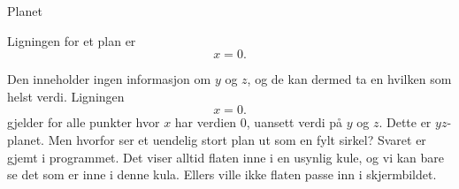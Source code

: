 \documentclass[no]{./../../common/SurferDesc}%
\begin{document}
\footnotesize
%

\begin{surferPage}
  \begin{surferTitle}Planet\end{surferTitle}
   \begin{surferText}
Ligningen for et plan er \[x=0.\]

Den inneholder ingen informasjon om $y$ og $z$, og de kan dermed ta en hvilken som helst verdi. Ligningen \[x=0.\] gjelder
 for alle punkter hvor $x$ har verdien $0$, uansett verdi på $y$ og $z$. Dette er $yz$-planet.
\newline \newline
Men hvorfor ser et uendelig stort plan ut som en fylt sirkel? Svaret er gjemt i programmet. Det viser 
alltid flaten inne i en usynlig kule, og vi kan bare se det som er inne i denne kula. Ellers 
ville ikke flaten passe inn i skjermbildet. 
     \end{surferText}
\end{surferPage}

\end{document}
